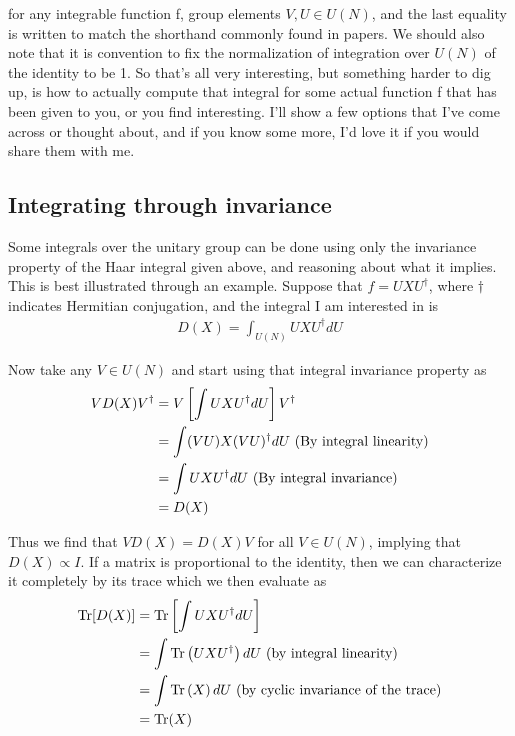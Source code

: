 \documentclass[11pt, oneside]{article}   	%
\begin{document}
for any integrable function f, group elements $V,U \in U(N)$, and the last equality is written to match the shorthand commonly found in papers.  
We should also note that it is convention to fix the normalization of integration over $U(N)$ of the identity to be 1.  
So that’s all very interesting, but something harder to dig up, is how to actually compute that integral for some actual function f that has been given to you, or you find interesting.  
I’ll show a few options that I’ve come across or thought about, and if you know some more, I’d love it if you would share them with me.


\subsection{Integrating through invariance}
Some integrals over the unitary group can be done using only the invariance property of the Haar integral given above, and reasoning about what it implies.  
This is best illustrated through an example.  
Suppose that $f = UXU^\dagger$, where $\dagger$ indicates Hermitian conjugation, and the integral I am interested in is
\begin{align*} 
D(X) = \int_{U(N)} UXU^\dagger dU 
\end{align*}

Now take any $V \in U(N)$ and start using that integral invariance property as
\begin{align*} 
VD(X)V^{\dagger} 
&= V \left[ \int UXU^\dagger dU \right] V^\dagger \notag \\ 
&= \int (VU)X(VU)^\dagger dU  \text{ (By integral linearity)} \notag \\ 
&= \int UXU^\dagger dU  \text{ (By integral invariance)} \notag \\ 
&= D(X) 
\end{align*}

Thus we find that $VD(X) = D(X)V$ for all $V \in U(N)$, implying that $D(X) \propto I$.  
If a matrix is proportional to the identity, then we can characterize it completely by its trace which we then evaluate as
\begin{align*} 
\text{Tr}[D(X)] 
&= \text{Tr} \left[ \int UXU^\dagger dU \right] \notag \\ 
&= \int \text{Tr} \left( UXU^\dagger \right) dU \text{ (by integral linearity)} \notag \\ 
&= \int \text{Tr} \left( X \right) dU \text{ (by cyclic invariance of the trace)} \notag \\ 
&= \text{Tr}(X) 
\end{align*}
\end{document}
